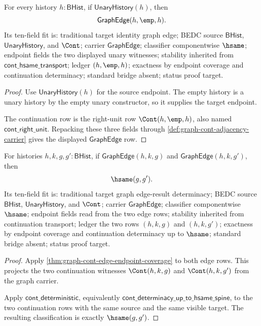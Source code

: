 \begin{theorem}
\label{thm:graph-cont-edge-empty-tail-identity}
For every history $h:\mathsf{BHist}$, if $\mathsf{UnaryHistory}(h)$, then
$$
\mathsf{GraphEdge}(h,\emp,h).
$$
Its ten-field fit is: traditional target identity graph edge; BEDC source
$\mathsf{BHist}$, $\mathsf{UnaryHistory}$, and $\Cont$; carrier
$\mathsf{GraphEdge}$; classifier componentwise $\hsame$; endpoint fields the
two displayed unary witnesses; stability inherited from
$\mathsf{cont\_hsame\_transport}$; ledger $(h,\emp,h)$; exactness by endpoint
coverage and continuation determinacy; standard bridge absent; status proof
target.
\end{theorem}
\begin{proof}
Use $\mathsf{UnaryHistory}(h)$ for the source endpoint. The empty history is a
unary history by the empty unary constructor, so it supplies the target
endpoint.

The continuation row is the right-unit row $\Cont(h,\emp,h)$, also named
$\mathsf{cont\_right\_unit}$. Repacking these three fields through
\autoref{def:graph-cont-adjacency-carrier} gives the displayed
$\mathsf{GraphEdge}$ row.
\end{proof}

\begin{theorem}
\label{thm:graph-cont-edge-result-determinacy}
For histories $h,k,g,g':\mathsf{BHist}$, if
$\mathsf{GraphEdge}(h,k,g)$ and $\mathsf{GraphEdge}(h,k,g')$, then
$$
\hsame(g,g').
$$
Its ten-field fit is: traditional target graph edge-result determinacy; BEDC
source $\mathsf{BHist}$, $\mathsf{UnaryHistory}$, and $\Cont$; carrier
$\mathsf{GraphEdge}$; classifier componentwise $\hsame$; endpoint fields read
from the two edge rows; stability inherited from continuation transport;
ledger the two rows $(h,k,g)$ and $(h,k,g')$; exactness by endpoint coverage
and continuation determinacy up to $\hsame$; standard bridge absent; status
proof target.
\end{theorem}
\begin{proof}
Apply \autoref{thm:graph-cont-edge-endpoint-coverage} to both edge rows. This
projects the two continuation witnesses $\Cont(h,k,g)$ and $\Cont(h,k,g')$
from the graph carrier.

Apply $\mathsf{cont\_deterministic}$, equivalently
$\mathsf{cont\_determinacy\_up\_to\_hsame\_spine}$, to the two continuation
rows with the same source and the same visible target. The resulting
classification is exactly $\hsame(g,g')$.
\end{proof}

